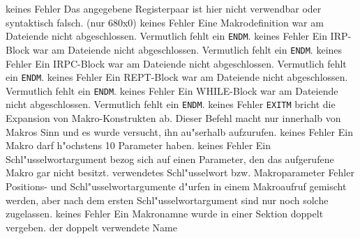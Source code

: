 \documentclass[12pt,a4paper,twoside]{report}
\newcommand{\tty}[1]{{\tt #1}}
\begin{document}
\begin{description}
               {keines}
               {Fehler}
               {Das angegebene Registerpaar ist hier nicht
                verwendbar oder syntaktisch falsch. (nur 680x0)}
               {keines}
               {Fehler}
               {Eine Makrodefinition war am Dateiende nicht
                abgeschlossen.  Vermutlich fehlt ein \tty{ENDM}.}
               {keines}
               {Fehler}
               {Ein IRP-Block war am Dateiende nicht
                abgeschlossen.  Vermutlich fehlt ein \tty{ENDM}.}
               {keines}
               {Fehler}
               {Ein IRPC-Block war am Dateiende nicht
                abgeschlossen.  Vermutlich fehlt ein \tty{ENDM}.}
               {keines}
               {Fehler}
               {Ein REPT-Block war am Dateiende nicht
                abgeschlossen.  Vermutlich fehlt ein \tty{ENDM}.}
               {keines}
               {Fehler}
               {Ein WHILE-Block war am Dateiende nicht
                abgeschlossen.  Vermutlich fehlt ein \tty{ENDM}.}
               {keines}
               {Fehler}
               {\tty{EXITM} bricht die Expansion von
                Makro-Konstrukten ab.  Dieser Befehl macht nur innerhalb
                von Makros Sinn und es wurde versucht, ihn au"serhalb
                aufzurufen.}
               {keines}
               {Fehler}
               {Ein Makro darf h"ochstens 10 Parameter haben.}
               {keines}
               {Fehler}
               {Ein Schl"usselwortargument bezog sich auf einen
                Parameter, den das aufgerufene Makro gar nicht
                besitzt.}
               {verwendetes Schl"usselwort bzw. Makroparameter}
               {Fehler}
               {Positions- und Schl"usselwortargumente d"urfen in
                einem Makroaufruf gemischt werden, aber nach dem
                ersten Schl"usselwortargument sind nur noch
                solche zugelassen.}
               {keines}
               {Fehler}
               {Ein Makronamne wurde in einer Sektion doppelt
                vergeben.}
               {der doppelt verwendete Name}

\end{description}
\end{document}

